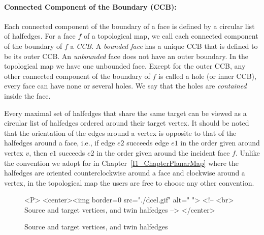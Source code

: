 \paragraph{Connected Component of the Boundary (CCB):}
Each connected component of the boundary of a face is %
defined by a
circular list of halfedges. 
For a face $f$ of a topological map, 
we call each
connected component of the boundary of $f$ a {\em CCB}.
A {\em bounded face} has a
unique CCB that is defined to be
its outer CCB. An
{\em unbounded\/} face does not have an outer boundary.
In the topological map we have one unbounded face.
Except for the outer CCB, any other
connected component of the boundary of $f$ is called a hole (or inner CCB),
every face can have none
or several holes.
We say that the holes are {\em contained\/} inside
the face.

Every maximal set of halfedges that share the same target can be viewed 
as a circular list of halfedges ordered %
around their target vertex.
It should be noted that the orientation of the edges around a vertex is 
opposite to that of the halfedges around a face, i.e., if edge $e2$
succeeds edge $e1$ in the order given around vertex $v$, then $e1$
succeeds $e2$ in the order given around the incident face $f$.
Unlike the convention we adopt
for  in Chapter~\ref{I1_ChapterPlanarMap} where the halfedges
are oriented counterclockwise around a face and clockwise around a vertex,
in the topological map the users are free to choose any other convention.

\begin{figure}
\begin{ccTexOnly}
    \centerline{
       }
\end{ccTexOnly}
\caption{Source and target vertices, and twin halfedges \label{fig:DCEL}}

\begin{ccHtmlOnly}
<P>
<center><img border=0 src="./dcel.gif" alt=" ">
<!-- <br> Source and target vertices, and twin halfedges -->
</center>
\end{ccHtmlOnly}
\end{figure}

